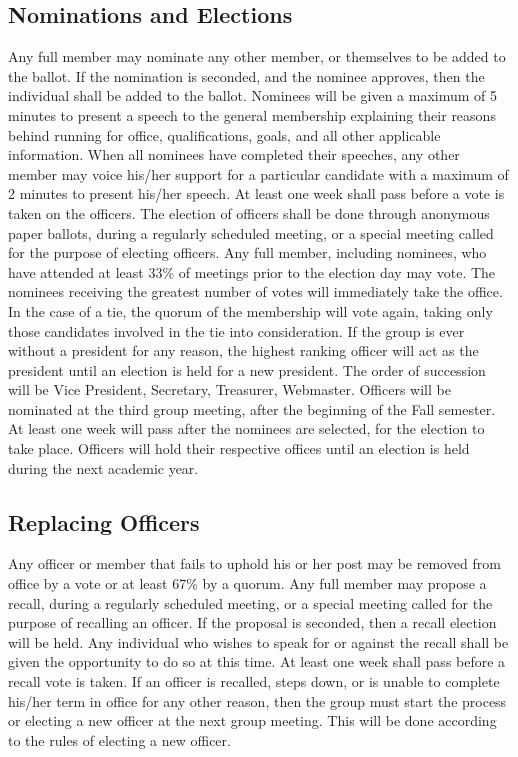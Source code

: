 \documentclass{article}
\begin{document}
\subsection{Nominations and Elections}
Any full member may nominate any other member, or themselves to be added to the ballot.  If the nomination is seconded, and the nominee approves, then the individual shall be added to the ballot. Nominees will be given a maximum of 5 minutes to present a speech to the general membership explaining their reasons behind running for office, qualifications, goals, and all other applicable information. When all nominees have completed their speeches, any other member may voice his/her support for a particular candidate with a maximum of 2 minutes to present his/her speech.  At least one week shall pass before a vote is taken on the officers. The election of officers shall be done through anonymous paper ballots, during a regularly scheduled meeting, or a special meeting called for the purpose of electing officers.  Any full member, including nominees, who have attended at least 33\% of meetings prior to the election day may vote.  The nominees receiving the greatest number of votes will immediately take the office. In the case of a tie, the quorum of the membership will vote again, taking only those candidates involved in the tie into consideration. If the group is ever without a president for any reason, the highest ranking officer will act as the president until an election is held for a new president.  The order of succession will be Vice President, Secretary, Treasurer, Webmaster. Officers will be nominated at the third group meeting, after the beginning of the Fall semester.  At least one week will pass after the nominees are selected, for the election to take place.  Officers will hold their respective offices until an election is held during the next academic year.

\subsection{Replacing Officers}
Any officer or member that fails to uphold his or her post may be removed from office by a vote or at least 67\% by a quorum.  Any full member may propose a recall, during a regularly scheduled meeting, or a special meeting called for the purpose of recalling an officer.  If the proposal is seconded, then a recall election will be held.  Any individual who wishes to speak for or against the recall shall be given the opportunity to do so at this time. At least one week shall pass before a recall vote is taken.
If an officer is recalled, steps down, or is unable to complete his/her term in office for any other reason, then the group must start the process or electing a new officer at the next group meeting.  This will be done according to the rules of electing a new officer.
\end{document}
